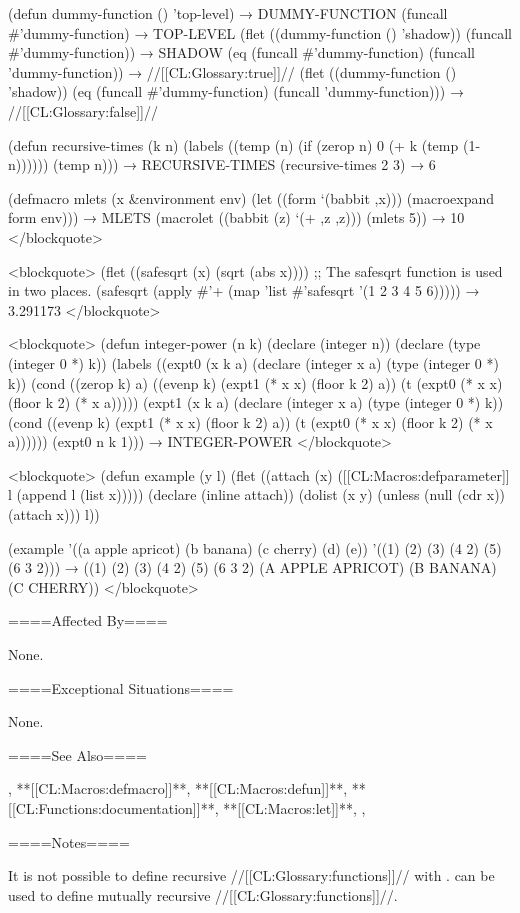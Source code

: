 (defun dummy-function () 'top-level) → DUMMY-FUNCTION (funcall #'dummy-function) → TOP-LEVEL (flet ((dummy-function () 'shadow)) (funcall #'dummy-function)) → SHADOW (eq (funcall #'dummy-function) (funcall 'dummy-function)) → //[[CL:Glossary:true]]// (flet ((dummy-function () 'shadow)) (eq (funcall #'dummy-function) (funcall 'dummy-function))) → //[[CL:Glossary:false]]//

(defun recursive-times (k n) (labels ((temp (n) (if (zerop n) 0 (+ k (temp (1- n)))))) (temp n))) → RECURSIVE-TIMES (recursive-times 2 3) → 6

(defmacro mlets (x &environment env) (let ((form `(babbit ,x))) (macroexpand form env))) → MLETS (macrolet ((babbit (z) `(+ ,z ,z))) (mlets 5)) → 10 </blockquote>

<blockquote> (flet ((safesqrt (x) (sqrt (abs x)))) ;; The safesqrt function is used in two places. (safesqrt (apply #'+ (map 'list #'safesqrt '(1 2 3 4 5 6))))) → 3.291173 </blockquote>

<blockquote> (defun integer-power (n k) (declare (integer n)) (declare (type (integer 0 *) k)) (labels ((expt0 (x k a) (declare (integer x a) (type (integer 0 *) k)) (cond ((zerop k) a) ((evenp k) (expt1 (* x x) (floor k 2) a)) (t (expt0 (* x x) (floor k 2) (* x a))))) (expt1 (x k a) (declare (integer x a) (type (integer 0 *) k)) (cond ((evenp k) (expt1 (* x x) (floor k 2) a)) (t (expt0 (* x x) (floor k 2) (* x a)))))) (expt0 n k 1))) → INTEGER-POWER </blockquote>

<blockquote> (defun example (y l) (flet ((attach (x) ([[CL:Macros:defparameter]] l (append l (list x))))) (declare (inline attach)) (dolist (x y) (unless (null (cdr x)) (attach x))) l))

(example '((a apple apricot) (b banana) (c cherry) (d) (e)) '((1) (2) (3) (4 2) (5) (6 3 2))) → ((1) (2) (3) (4 2) (5) (6 3 2) (A APPLE APRICOT) (B BANANA) (C CHERRY)) </blockquote>

====Affected By====

None.

====Exceptional Situations====

None.

====See Also====

, **[[CL:Macros:defmacro]]**, **[[CL:Macros:defun]]**, **[[CL:Functions:documentation]]**, **[[CL:Macros:let]]**, {\secref\Evaluation}, {\secref\DocVsDecls}

====Notes====

It is not possible to define recursive //[[CL:Glossary:functions]]// with .  can be used to define mutually recursive //[[CL:Glossary:functions]]//.


